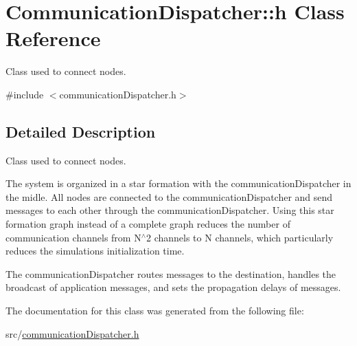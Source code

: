 \hypertarget{class_communication_dispatcher_1_1h}{}\section{Communication\+Dispatcher\+:\+:h Class Reference}
\label{class_communication_dispatcher_1_1h}


Class used to connect nodes.  




{\ttfamily \#include $<$communication\+Dispatcher.\+h$>$}



\subsection{Detailed Description}
Class used to connect nodes. 

The system is organized in a star formation with the communication\+Dispatcher in the midle. All nodes are connected to the communication\+Dispatcher and send messages to each other through the communication\+Dispatcher. Using this star formation graph instead of a complete graph reduces the number of communication channels from N$^\wedge$2 channels to N channels, which particularly reduces the simulation\textquotesingle{}s initialization time.

The communication\+Dispatcher routes messages to the destination, handles the broadcast of application messages, and sets the propagation delays of messages. 

The documentation for this class was generated from the following file\+:\begin{DoxyCompactItemize}
\item 
src/\hyperlink{communication_dispatcher_8h}{communication\+Dispatcher.\+h}\end{DoxyCompactItemize}
